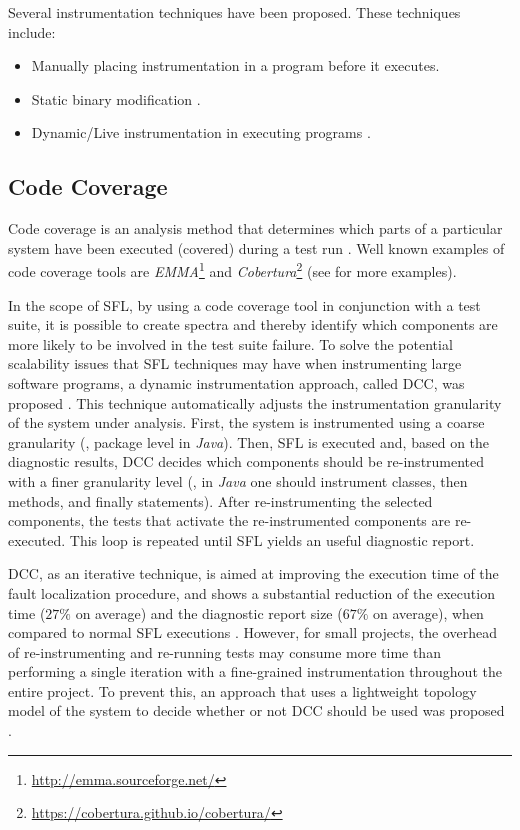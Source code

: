 Several instrumentation techniques have been proposed.
%
These techniques include:
\begin{itemize}[nolistsep]
\item Manually placing instrumentation in a program before it
  executes.
\item Static binary modification \citep{Bus04,Larus95,Srivastava94}.
\item Dynamic/Live instrumentation in executing programs
  \citep{Arnold01,Hollingsworth97,Luk05a,Luk05b,Lattner02,Nethercote03}.
\end{itemize}




\subsection*{Code Coverage}
\label{sec:related-work:code-coverage}
Code coverage is an analysis method that determines which parts of a
particular system have been executed (covered) during a test run
\citep{Miller63,Graham06}.
%
Well known examples of code coverage tools are
\emph{EMMA}\footnote{\url{http://emma.sourceforge.net/}} and
\emph{Cobertura}\footnote{\url{https://cobertura.github.io/cobertura/}}
(see \citep{Yang06} for more examples).





In the scope of \ac{SFL}, by using a code coverage tool in conjunction
with a test suite, it is possible to create spectra and thereby
identify which components are more likely to be involved in the test
suite failure.
%
To solve the potential scalability issues that \ac{SFL} techniques may
have when instrumenting large software programs, a dynamic
instrumentation approach, called \ac{DCC}, was proposed
\citep{Perez12a}.
%
This technique automatically adjusts the instrumentation granularity
of the system under analysis.
%
First, the system is instrumented using a coarse granularity (\eg,
package level in \emph{Java}).
%
Then, \ac{SFL} is executed and, based on the diagnostic results,
\ac{DCC} decides which components should be re-instrumented with a
finer granularity level (\eg, in \emph{Java} one should instrument
classes, then methods, and finally statements).
%
After re-instrumenting the selected components, the tests that
activate the re-instrumented components are re-executed.
%
This loop is repeated until \ac{SFL} yields an useful diagnostic
report.

\ac{DCC}, as an iterative technique, is aimed at improving the
execution time of the fault localization procedure, and shows a
substantial reduction of the execution time ($27\%$ on average) and
the diagnostic report size ($67\%$ on average), when compared to
normal \ac{SFL} executions \citep{Perez12a}.
%
However, for small projects, the overhead of re-instrumenting and
re-running tests may consume more time than performing a single
iteration with a fine-grained instrumentation throughout the entire
project.
%
To prevent this, an approach that uses a lightweight topology model of
the system to decide whether or not \ac{DCC} should be used was
proposed \citep{Perez12b}.

